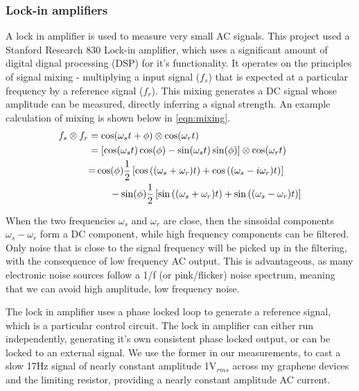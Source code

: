 \documentclass[../../Matt_Gebert_Honours_Thesis.tex]{subfiles}
\begin{document}
	\subsubsection{Lock-in amplifiers}
	A lock in amplifier is used to measure very small AC signals. This project used a Stanford Research 830 Lock-in amplifier\cite{sr830}, which uses a significant amount of digital dignal processing (DSP) for it's functionality. It operates on the principles of signal mixing - multiplying a input signal ($f_s$) that is expected at a particular frequency by a reference signal ($f_r$). This mixing generates a DC signal whose amplitude can be measured, directly inferring a signal strength. An example calculation of mixing is shown below in \cref{eqn:mixing}.
	\begin{align}
	f_{s}\otimes f_{r} &= \cos(\omega_{s} t + \phi) \otimes \cos(\omega_{r} t )\\
	&=	\left[\cos(\omega_{s} t)\cos(\phi) - \sin(\omega_{s}t)\sin(\phi)\right] \otimes \cos(\omega_{r} t )\nonumber\\
	&\begin{aligned}
		=&\cos(\phi)\frac{1}{2}\left[\cos\left(( \omega_s+  \omega_r)t\right) + \cos\left({( \omega_s - i \omega_r)t} \right)\right]\\
		&\hspace{0.5cm}-\sin(\phi)\frac{1}{2}\left[\sin\left((\omega_s + \omega_r)t\right)  + \sin\left((\omega_s - \omega_r)t\right)\right]
	\end{aligned}\label{eqn:mixing}
	\end{align}
	
	When the two frequencies $\omega_s$ and $\omega_r$ are close, then the sinsoidal components $\omega_s-\omega_r$ form a DC component, while high frequency components can be filtered. Only noise that is close to the signal frequency will be picked up in the filtering, with the consequence of low frequency AC output. This is advantageous, as many electronic noise sources follow a 1/f (or pink/flicker) noise spectrum\cite{voss_flicker_1976,hooge_1/f_1994}, meaning that we can avoid high amplitude, low frequency noise. %
	
	The lock in amplifier uses a phase locked loop to generate a reference signal, which is a particular control circuit. The lock in amplifier can either run independently, generating it's own consistent phase locked output, or can be locked to an external signal. We use the former in our measurements, to cast a slow 17Hz signal of nearly constant amplitude 1V$_{rms}$ across my graphene devices and the limiting resistor, providing a nearly constant amplitude AC current. 
	
\end{document}
